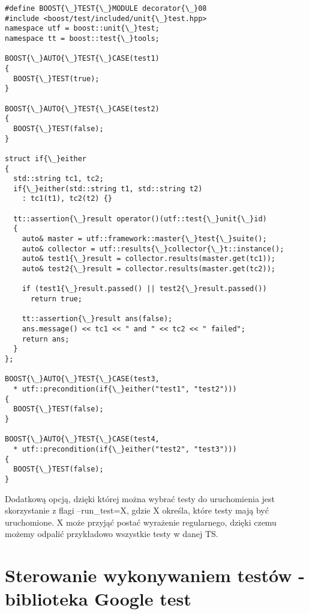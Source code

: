 \documentclass[12pt,a4paper,notitlepage]{report}
\begin{document}
		\begin{lstlisting}[label=some-code,caption=Listing programu rysującego model jajka w 3D]
#define BOOST{\_}TEST{\_}MODULE decorator{\_}08
#include <boost/test/included/unit{\_}test.hpp>
namespace utf = boost::unit{\_}test;
namespace tt = boost::test{\_}tools;

BOOST{\_}AUTO{\_}TEST{\_}CASE(test1)
{
  BOOST{\_}TEST(true);
}

BOOST{\_}AUTO{\_}TEST{\_}CASE(test2)
{
  BOOST{\_}TEST(false);
}

struct if{\_}either
{
  std::string tc1, tc2;
  if{\_}either(std::string t1, std::string t2)
    : tc1(t1), tc2(t2) {}

  tt::assertion{\_}result operator()(utf::test{\_}unit{\_}id)
  {
    auto& master = utf::framework::master{\_}test{\_}suite();
    auto& collector = utf::results{\_}collector{\_}t::instance();
    auto& test1{\_}result = collector.results(master.get(tc1));
    auto& test2{\_}result = collector.results(master.get(tc2));

    if (test1{\_}result.passed() || test2{\_}result.passed())
      return true;

    tt::assertion{\_}result ans(false);
    ans.message() << tc1 << " and " << tc2 << " failed";
    return ans;
  }
};

BOOST{\_}AUTO{\_}TEST{\_}CASE(test3,
  * utf::precondition(if{\_}either("test1", "test2")))
{
  BOOST{\_}TEST(false);
}

BOOST{\_}AUTO{\_}TEST{\_}CASE(test4,
  * utf::precondition(if{\_}either("test2", "test3")))
{
  BOOST{\_}TEST(false);
}
		\end{lstlisting}

Dodatkową opcją, dzięki której można wybrać testy do uruchomienia jest skorzystanie z flagi --run{\_}test=X, gdzie X określa, które testy mają być uruchomione. X może przyjąć postać wyrażenie regularnego, dzięki czemu możemy odpalić przykładowo wszystkie testy w danej TS.

\section{Sterowanie wykonywaniem testów - biblioteka Google test}
\end{document}
